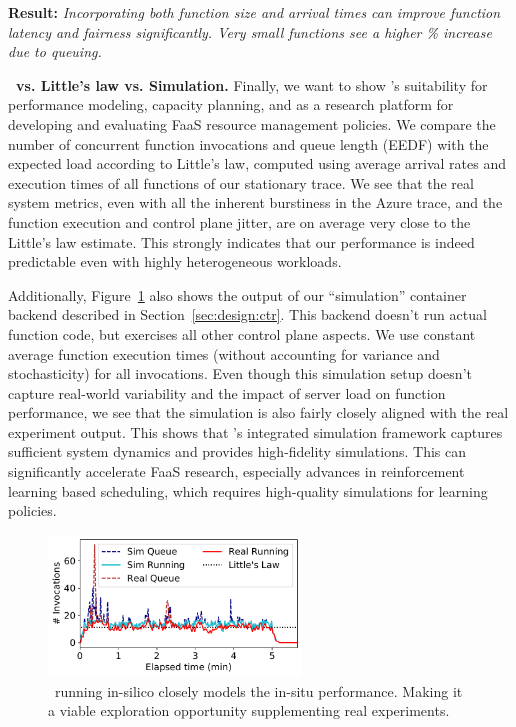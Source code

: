 
\noindent \textbf{Result:} \emph{Incorporating both function size and arrival times can improve function latency and fairness significantly. Very small functions see a higher \% increase due to queuing.}




\noindent \textbf{\sysname~vs. Little's law vs. Simulation.}
Finally, we want to show \sysname's suitability for performance modeling, capacity planning, and as a research platform for developing and evaluating FaaS resource management policies.
We compare the number of concurrent function invocations and queue length (EEDF) with the expected load according to Little's law, computed using average arrival rates and execution times of all functions of our stationary trace. 
We see that the real system metrics, even with all the inherent burstiness in the Azure trace, and the function execution and control plane jitter, are on average very close to the Little's law estimate.
This strongly indicates that our performance is indeed predictable even with highly heterogeneous workloads.

Additionally, Figure~\ref{fig:sim-vs-live-little} also shows the output of our ``simulation'' container backend described in Section~\ref{sec:design:ctr}.
This backend doesn't run actual function code, but exercises all other control plane aspects.
We use constant average function execution times (without accounting for variance and stochasticity) for all invocations.
Even though this simulation setup doesn't capture real-world variability and the impact of server load on function performance, we see that the simulation is also fairly closely aligned with the real experiment output.
This shows that \sysname's integrated simulation framework captures sufficient system dynamics and provides high-fidelity simulations.
This can significantly accelerate FaaS research, especially advances in reinforcement learning based scheduling, which requires high-quality simulations for learning policies. 

\begin{figure}
  \includegraphics[width=0.6\textwidth]{iluvatar/graphs/trace-compare/baseline/minheap_ed/16/paper-status.pdf}
  \caption{\sysname~running in-silico closely models the in-situ performance. Making it a viable exploration opportunity supplementing real experiments.}
  \label{fig:sim-vs-live-little}
\end{figure}

